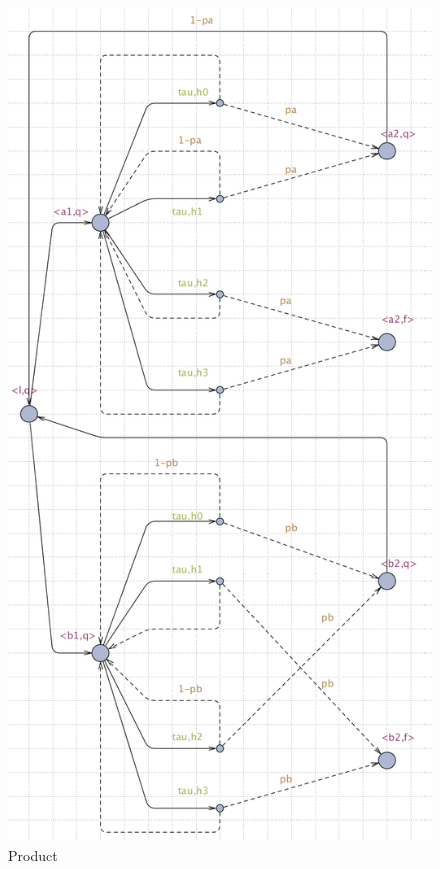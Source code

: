 \begin{figure}
    \raggedright
    \begin{minipage}[t]{0.6\linewidth}  
        \raggedright
        \includegraphics[width=1.6\linewidth]{product.png}  
        \centering  
        \caption{Product}  
        \label{fig:product}  
    \end{minipage}  
\end{figure}  